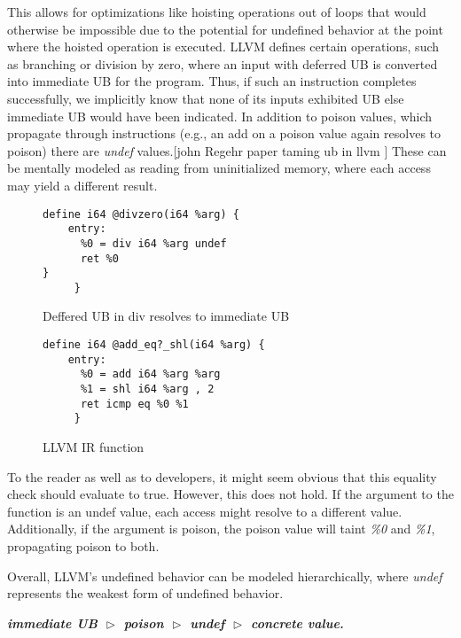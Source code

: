 This allows for optimizations like hoisting operations out of loops that would otherwise be impossible due to the potential for undefined behavior at the point where the hoisted operation is executed. LLVM defines certain operations, such as branching or division by zero, where an input with deferred UB is converted into immediate UB for the program. 
Thus, if such an instruction completes successfully, we implicitly know that none of its inputs exhibited UB else immediate UB would have been indicated. In addition to poison values, which propagate through instructions (e.g., an add on a poison value again resolves to poison) there are \textit{undef} values.[john Regehr paper taming ub in llvm ] These can be mentally modeled as reading from uninitialized memory, where each access may yield a different result.
\begin{figure}
\begin{minipage}{0.45\textwidth}
\begin{lstlisting}
define i64 @divzero(i64 %arg) {
    entry:
      %0 = div i64 %arg undef
      ret %0
}
     }
\end{lstlisting}
\end{minipage}
\caption{Deffered UB in div resolves to immediate UB}
\label{fig:LLVMIR-SEMANTICS-SHL}
\end{figure}

\begin{figure}
\begin{minipage}{0.45\textwidth}
\begin{lstlisting}
define i64 @add_eq?_shl(i64 %arg) {
    entry:
      %0 = add i64 %arg %arg
      %1 = shl i64 %arg , 2
      ret icmp eq %0 %1
     }
\end{lstlisting}
\end{minipage}
\caption{LLVM IR function}
\label{fig:LLVMIR-SEMANTICS-SHL}
\end{figure}

To the reader as well as to developers, it might seem obvious that this equality check should evaluate to true. However, this does not hold. If the argument to the function is an undef value, each access might resolve to a different value. Additionally, if the argument is poison, the poison value will taint \textit{\%0} and \textit{\%1}, propagating poison to both.

Overall, LLVM's undefined behavior can be modeled hierarchically, where \textit{undef} represents the weakest form of undefined behavior.

\textit{\textbf{immediate  UB $\vartriangleright$ poison $\vartriangleright $ undef $\vartriangleright$ concrete value.}}

